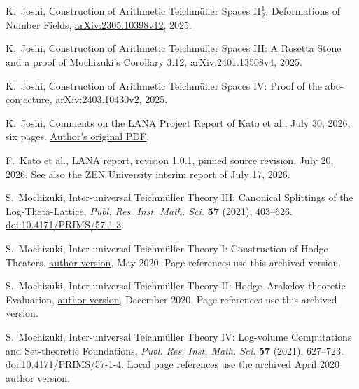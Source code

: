 \documentclass[11pt]{amsart}
\theoremstyle{definition}
\theoremstyle{remark}
\begin{document}
\begin{thebibliography}{99}
K.~Joshi, Construction of Arithmetic Teichm\"uller Spaces II$\frac12$:
Deformations of Number Fields,
\href{https://arxiv.org/abs/2305.10398v12}{arXiv:2305.10398v12}, 2025.

K.~Joshi, Construction of Arithmetic Teichm\"uller Spaces III:
A Rosetta Stone and a proof of Mochizuki's Corollary 3.12,
\href{https://arxiv.org/abs/2401.13508v4}{arXiv:2401.13508v4}, 2025.

K.~Joshi, Construction of Arithmetic Teichm\"uller Spaces IV:
Proof of the abc-conjecture,
\href{https://arxiv.org/abs/2403.10430v2}{arXiv:2403.10430v2}, 2025.

K.~Joshi, Comments on the LANA Project Report of Kato et al.,
July 30, 2026, six pages.
\href{https://sites.arizona.edu/kirti-joshi/files/2026/07/Comments-on-the-LANA-Project-Report-of-Kato-et-al.pdf}{Author's original PDF}.

F.~Kato et al., LANA report, revision 1.0.1,
\href{https://github.com/katobungen/LANA_report_202607/tree/293bdd89463473ae13d40834d70fb4b7ba81da1f}{pinned source revision}, July 20, 2026.
See also the \href{https://zen.ac.jp/news/zmcpostevent0717e}{ZEN University
interim report of July 17, 2026}.

S.~Mochizuki, Inter-universal Teichm\"uller Theory III:
Canonical Splittings of the Log-Theta-Lattice,
\emph{Publ. Res. Inst. Math. Sci.} \textbf{57} (2021), 403--626.
\href{https://doi.org/10.4171/PRIMS/57-1-3}{doi:10.4171/PRIMS/57-1-3}.

S.~Mochizuki, Inter-universal Teichm\"uller Theory I:
Construction of Hodge Theaters,
\href{https://www.kurims.kyoto-u.ac.jp/~motizuki/Inter-universal%20Teichmuller%20Theory%20I.pdf}{author version}, May 2020.
Page references use this archived version.

S.~Mochizuki, Inter-universal Teichm\"uller Theory II:
Hodge--Arakelov-theoretic Evaluation,
\href{https://www.kurims.kyoto-u.ac.jp/~motizuki/Inter-universal%20Teichmuller%20Theory%20II.pdf}{author version}, December 2020.
Page references use this archived version.

S.~Mochizuki, Inter-universal Teichm\"uller Theory IV:
Log-volume Computations and Set-theoretic Foundations,
\emph{Publ. Res. Inst. Math. Sci.} \textbf{57} (2021), 627--723.
\href{https://doi.org/10.4171/PRIMS/57-1-4}{doi:10.4171/PRIMS/57-1-4}.
Local page references use the archived April 2020
\href{https://www.kurims.kyoto-u.ac.jp/~motizuki/Inter-universal%20Teichmuller%20Theory%20IV.pdf}{author version}.


\end{thebibliography}
\end{document}

